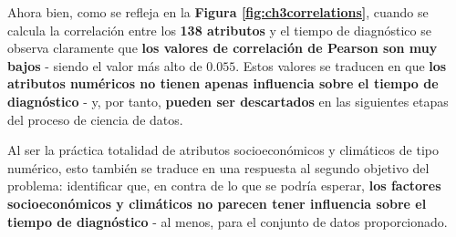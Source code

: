 Ahora bien, como se refleja en la \textbf{Figura \ref{fig:ch3correlations}}, cuando se calcula la correlación entre los \textbf{138 atributos} y el tiempo de diagnóstico se observa claramente que \textbf{los valores de correlación de Pearson son muy bajos} - siendo el valor más alto de $0.055$. Estos valores se traducen en que \textbf{los atributos numéricos no tienen apenas influencia sobre el tiempo de diagnóstico} - y, por tanto, \textbf{pueden ser descartados} en las siguientes etapas del proceso de ciencia de datos.

Al ser la práctica totalidad de atributos socioeconómicos y climáticos de tipo numérico, esto también se traduce en una respuesta al segundo objetivo del problema: identificar que, en contra de lo que se podría esperar, \textbf{los factores socioeconómicos y climáticos no parecen tener influencia sobre el tiempo de diagnóstico} - al menos, para el conjunto de datos proporcionado.